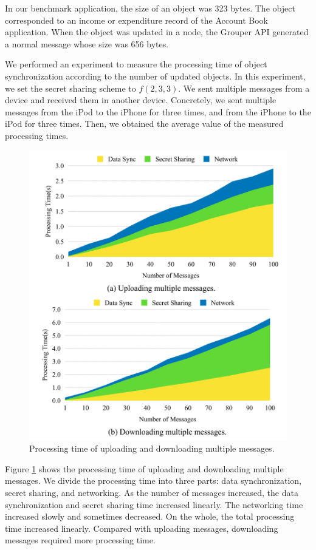 \documentclass[a4paper,11pt]{report}
\begin{document}
In our benchmark application, the size of an object was 323 bytes.
The object corresponded to an income or expenditure record of the Account Book application.
When the object was updated in a node, the Grouper API generated a normal message whose size was 656 bytes.

We performed an experiment to measure the processing time of object synchronization according to the number of updated objects.
In this experiment, we set the secret sharing scheme to ${f(2, 3, 3)}$.
We sent multiple messages from a device and received them in another device. 
Concretely, we sent multiple messages from the iPod to the iPhone for three times, and from the iPhone to the iPod for three times.
Then, we obtained the average value of the measured processing times.

\begin{figure}[t]
	\centering
	\includegraphics[scale=0.17]{multiple_messages}
	\caption{Processing time of uploading and downloading multiple messages.}
	\label{fig:processing_time_multiple_message}
\end{figure}

Figure \ref{fig:processing_time_multiple_message} shows the processing time of uploading and downloading multiple messages.
We divide the processing time into three parts: data synchronization, secret sharing, and networking.
As the number of messages increased, the data synchronization and secret sharing time increased linearly. 
The networking time increased slowly and sometimes decreased.
On the whole, the total processing time increased linearly.
Compared with uploading messages, downloading messages required more processing time.
\end{document}
